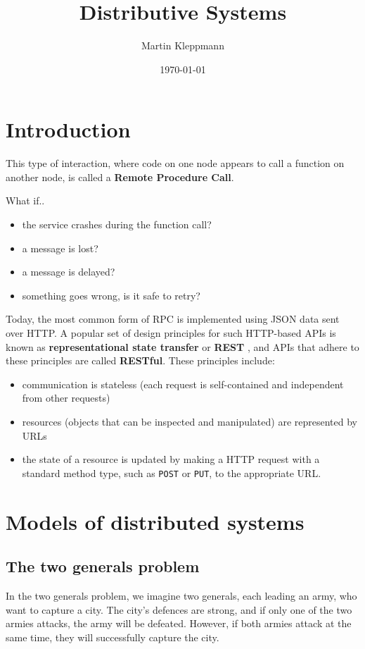 \documentclass[11pt]{article}
\author{Martin Kleppmann}
\date{\today}
\title{Distributive Systems}
\begin{document}
\maketitle
\tableofcontents

\section{Introduction}
\label{sec:org040af72}
This type of interaction, where code on one node appears to call a function on another node, is
called a \textbf{Remote Procedure Call}.

What if..
\begin{itemize}
\item the service crashes during the function call?
\item a message is lost?
\item a message is delayed?
\item something goes wrong, is it safe to retry?
\end{itemize}

Today, the most common form of RPC is implemented using JSON data sent over HTTP. A popular set
of design principles for such HTTP-based APIs is known as \textbf{representational state transfer} or
\textbf{REST} , and APIs that adhere to these principles are called \textbf{RESTful}. These
principles include:
\begin{itemize}
\item communication is stateless (each request is self-contained and independent from other requests)
\item resources (objects that can be inspected and manipulated) are represented by URLs
\item the state of a resource is updated by making a HTTP request with a standard method type, such
as \texttt{POST} or \texttt{PUT}, to the appropriate URL.
\end{itemize}
\section{Models of distributed systems}
\label{sec:orgb1f3373}
\subsection{The two generals problem}
\label{sec:org07f8c08}
In the two generals problem, we imagine two generals, each leading an army, who
want to capture a city. The city’s defences are strong, and if only one of the two armies
attacks, the army will be defeated. However, if both armies attack at the same time, they will
successfully capture the city.
\end{document}
